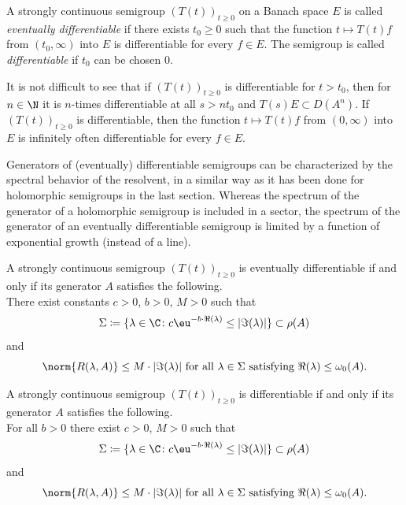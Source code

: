 \begin{definition}\label{def:a2-1.16}
A strongly continuous semigroup $(T(t))_{t \geq 0}$ on a Banach space $E$ is called \emph{eventually differentiable} if there exists $t_0 \geq 0$ such that the function $t \mapsto T(t)f$ from $(t_0,\infty)$ into $E$ is differentiable for every $f \in E$.
The semigroup is called \emph{differentiable} if\/ $t_0$ can be chosen $0$.
\end{definition}

It is not difficult to see that if\/ $(T(t))_{t \geq 0}$ is differentiable for $t > t_{0}$, then for $n \in \N$ it is $n$-times differentiable at all $s > nt_{0}$ and $T(s)E \subset D(A^n)$. 
If\/ $(T(t))_{t\geq 0}$ is differentiable, then the function $t \mapsto T(t)f$ from $(0,\infty)$ into $E$ is infinitely often differentiable for every $f \in E$.

Generators of (eventually) differentiable semigroups 
can be characterized by the spectral behavior of the resolvent,
in a similar way as it has been done for holomorphic semigroups in the last section.
Whereas the spectrum of the generator of a holomorphic semigroup is included in a sector, the spectrum of the generator of an eventually differentiable semigroup is limited by a function of exponential growth (instead of a line).
\begin{theorem}\label{thm:a2-1.17}
A strongly continuous semigroup $(T(t))_{t\geq 0}$ is eventually differentiable if and only if its generator $A$ satisfies the following. \\
There exist constants $c>0$, $b>0$, $M>0$ such that
\[
    \Sigma \coloneqq \{\lambda \in \C \colon c\eu^{-b\cdot \Re(\lambda)} \leq |\Im(\lambda)|\} \subset \rho(A)
\]
and
\[
    \norm{R(\lambda,A)} \leq M\cdot|\Im(\lambda)| \text{ for all } \lambda \in \Sigma \text{ satisfying } \Re(\lambda) \leq \omega_{0}(A).
\]
\end{theorem}

\begin{theorem}\label{thm:a2-1.18}
A strongly continuous semigroup $(T(t))_{t\geq 0}$ is differentiable if and only if its generator $A$ satisfies the following. \\
For all $b>0$ there exist $c>0$, $M>0$ such that
\[
    \Sigma \coloneqq \{\lambda \in \C \colon c\eu^{-b\cdot \Re(\lambda)} 
    	\leq  \lvert \Im(\lambda) \rvert\} \subset \rho(A)
\]
and
\[
    \norm{R(\lambda,A)} \leq M\cdot \lvert \Im(\lambda) \rvert \text{ for all } \lambda \in \Sigma \text{ satisfying } \Re(\lambda) \leq \omega_{0}(A).
\]
\end{theorem}

